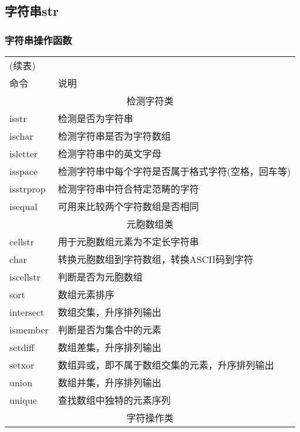     \subsection{字符串str}
        \subsubsection{字符串操作函数}
            \begin{longtable}{|l|l|}
            \hline
            \endfirsthead
            \multicolumn{2}{l}{(续表)}
            \endhead
            \hline
            \multicolumn{2}{c}{\itshape 接下页表格……}\\
            \endfoot
            \hline
            \endlastfoot
            命令 & 说明 \\
            \hline
            \multicolumn{2}{|c|}{检测字符类}\\
            \hline
            isstr &检测是否为字符串\\
            ischar & 检测字符串是否为字符数组\\
            isletter & 检测字符串中的英文字母\\
            isspace &检测字符串中每个字符是否属于格式字符(空格，回车等)\\
            isstrprop &检测字符串中符合特定范畴的字符\\
            isequal &可用来比较两个字符数组是否相同\\
            \hline
            \multicolumn{2}{|c|}{元胞数组类}\\
            \hline
            cellstr& 用于元胞数组元素为不定长字符串\\
            char & 转换元胞数组到字符数组，转换ASCII码到字符\\
            iscellstr &判断是否为元胞数组\\
            sort & 数组元素排序\\
            intersect& 数组交集，升序排列输出\\
            ismember & 判断是否为集合中的元素\\
            setdiff &数组差集，升序排列输出\\
            setxor & 数组异或，即不属于数组交集的元素，升序排列输出\\
            union &数组并集，升序排列输出\\
            unique & 查找数组中独特的元素序列\\
            \hline
            \multicolumn{2}{|c|}{字符操作类}\\

\end{longtable}
